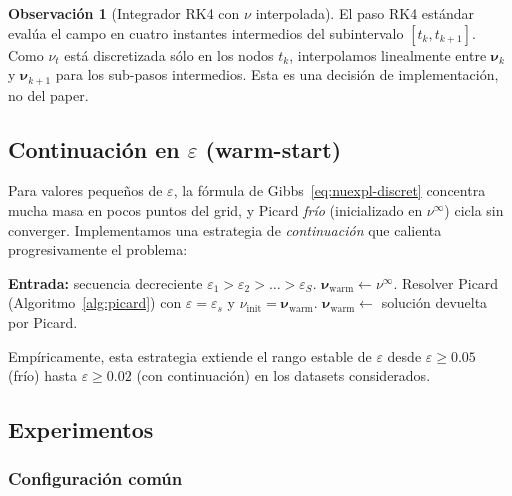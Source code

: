 \documentclass[11pt, a4paper]{article}
\theoremstyle{definition}
\newtheorem{remark}{Observación}[section]
\newcommand{\eps}{\varepsilon}
\begin{document}
\begin{remark}[Integrador RK4 con $\nu$ interpolada]
El paso RK4 estándar evalúa el campo en cuatro instantes intermedios
del subintervalo $[t_k, t_{k+1}]$. Como $\nu_t$ está discretizada
sólo en los nodos $t_k$, interpolamos linealmente entre
$\boldsymbol{\nu}_k$ y $\boldsymbol{\nu}_{k+1}$ para los sub-pasos
intermedios. Esta es una decisión de implementación, no del paper.
\end{remark}

\subsection{Continuación en $\eps$ (warm-start)}
\label{ssec:continuacion}

Para valores pequeños de $\eps$, la fórmula de
Gibbs~\eqref{eq:nuexpl-discret} concentra mucha masa en pocos puntos
del grid, y Picard \emph{frío} (inicializado en $\nu^{\infty}$) cicla
sin converger. Implementamos una estrategia de \emph{continuación} que
calienta progresivamente el problema:

\begin{algorithm}[H]
\caption{Continuación en $\eps$}
\label{alg:continuacion}
\begin{algorithmic}[1]
\State \textbf{Entrada:} secuencia decreciente
       $\eps_1 > \eps_2 > \dots > \eps_S$.
\State $\boldsymbol{\nu}_{\mathrm{warm}} \leftarrow \nu^{\infty}$.
  \State Resolver Picard (Algoritmo~\ref{alg:picard}) con
         $\eps = \eps_s$ y
         $\nu_{\mathrm{init}} = \boldsymbol{\nu}_{\mathrm{warm}}$.
  \State $\boldsymbol{\nu}_{\mathrm{warm}} \leftarrow $ solución
         devuelta por Picard.
\EndFor
\end{algorithmic}
\end{algorithm}

Empíricamente, esta estrategia extiende el rango estable de $\eps$ desde
$\eps \geq 0.05$ (frío) hasta $\eps \geq 0.02$ (con continuación) en
los datasets considerados.

\subsection{Experimentos}
\label{ssec:exp-explicita}

\subsubsection{Configuración común}
\end{document}
